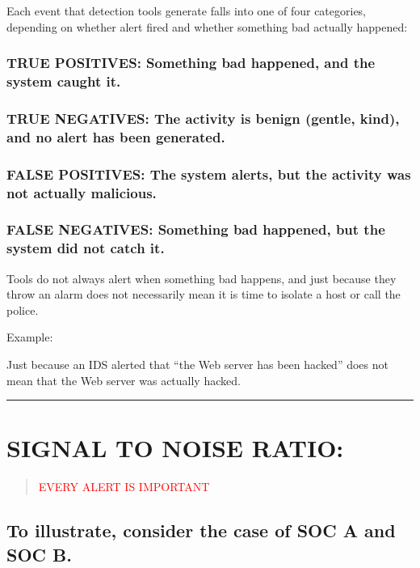 \documentclass[10pt,british,english]{article}
\begin{document}
Each event that detection tools generate falls into one of four categories,
depending on whether alert fired and whether something bad actually
happened:

\subsubsection{TRUE POSITIVES: Something bad happened, and the system caught it.}

\subsubsection{TRUE NEGATIVES: The activity is benign (gentle, kind), and no alert
has been generated.}

\subsubsection{FALSE POSITIVES: The system alerts, but the activity was not actually
malicious.}

\subsubsection{FALSE NEGATIVES: Something bad happened, but the system did not catch
it.}

Tools do not always alert when something bad happens, and just because
they throw an alarm does not necessarily mean it is time to isolate
a host or call the police. 

Example:

Just because an IDS alerted that \textquotedblleft the Web server
has been hacked\textquotedblright{} does not mean that the Web server
was actually hacked.

\rule[0.5ex]{1\columnwidth}{1pt}

\section{SIGNAL TO NOISE RATIO: }
\begin{quotation}
\noindent \begin{center}
\textcolor{red}{\LARGE{}EVERY ALERT IS IMPORTANT}{\LARGE\par}
\par\end{center}
\end{quotation}

\subsection{To illustrate, consider the case of SOC A and SOC B. }
\end{document}
